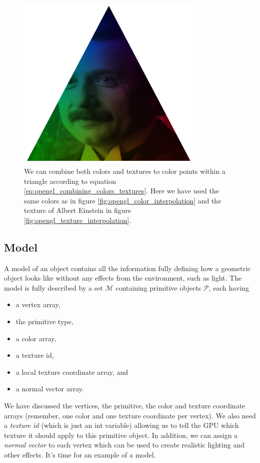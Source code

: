 \begin{figure}[h]
\begin{center}
\includegraphics[width=0.8\textwidth, trim=0cm 0cm 0cm 0cm, clip]{opengl/figures/color_and_texture.png}
\end{center}
\caption{We can combine both colors and textures to color points within a triangle according to equation \eqref{eq:opengl_combining_colors_textures}. Here we have used the same colors as in figure \ref{fig:opengl_color_interpolation} and the texture of Albert Einstein in figure \ref{fig:opengl_texture_interpolation}.}
\label{fig:color_and_texture}
\end{figure}

\subsection{Model}
\label{sec:opengl_model}
A model of an object contains all the information fully defining how a geometric object looks like without any effects from the environment, such as light. The model is fully described by a set $\mathcal{M}$ containing primitive objects $\mathcal{P}$, each having 
\begin{itemize}
	\item a vertex array,
	\item the primitive type,
	\item a color array,
	\item a texture id,
	\item a local texture coordinate array, and
	\item a normal vector array.
\end{itemize}
We have discussed the vertices, the primitive, the color and texture coordinate arrays (remember, one color and one texture coordinate per vertex). We also need a \textit{texture id} (which is just an int variable) allowing us to tell the GPU which texture it should apply to this primitive object. In addition, we can assign a \textit{normal vector} to each vertex which can be used to create realistic lighting and other effects. It's time for an example of a model.


